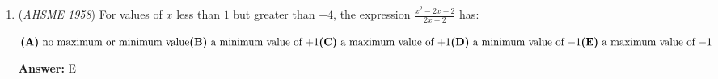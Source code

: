 \begin{enumerate}
 $\textbf{(A)}\ {x}\text{ cannot exceed }{70}\qquad \\ \textbf{(B)}\ {y}\text{ can equal }{2x}\qquad\\ \textbf{(C)}\ \text{the amount of the check cannot be a multiple of }{5}\qquad \\ \textbf{(D)}\ \text{the incorrect amount can equal twice the correct amount}\qquad \\ \textbf{(E)}\ \text{the sum of the digits of the correct amount is divisible by }{9}$

 \textbf{Answer: }B



\textbf{Solution}

The correct total number of cents is $100x+y$. Due to the error, it is cashed $100y+x$ cents. We have $100y+x-100x-y=1782$. Simplifying, we have $y-x=18$. Looking at the answer choices:

 A:  $y=89, x=71$ is a counterexample

 B:  Then $y=36, x=18$, correct.

 C:  As long as $y$ is a multiple of 5, the original amount is a multiple of 5. A counterexample is $x=15, y=33$.

 D:  Then the correct amount is 17.82, and the incorrect amount is 35.64. Obviously incorrect.

 E:  This is not fixed. A counterexample is $x=11,y=29$.

 Therefore, the correct answer is $\boxed{\textbf{(B)}\ {y}\text{ can equal }{2x}\qquad\\}$

 --Ethanol 2012

 btw please point out any mistakes I made cuz it's the first time I made a solution

 


	\item (\textit{AHSME 1958}) For values of $x$ less than $1$ but greater than $-4$, the expression
$\frac{x^2 - 2x + 2}{2x - 2}$
has:


 $\textbf{(A)}\ \text{no maximum or minimum value}\qquad \\ \textbf{(B)}\ \text{a minimum value of }{+1}\qquad \\ \textbf{(C)}\ \text{a maximum value of }{+1}\qquad \\ \textbf{(D)}\ \text{a minimum value of }{-1}\qquad \\ \textbf{(E)}\ \text{a maximum value of }{-1}$

 \textbf{Answer: }E




\end{enumerate}
